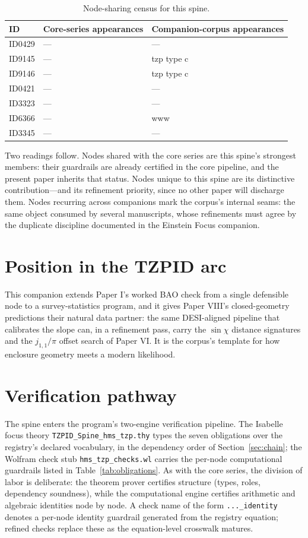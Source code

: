 \documentclass[11pt]{article}
\theoremstyle{remark}
\begin{document}
\begin{table}[ht]
\centering
\small
\caption{Node-sharing census for this spine.}
\label{tab:crosswalk}
\begin{tabular}{lp{4.4cm}p{6.6cm}}
\toprule
ID & Core-series appearances & Companion-corpus appearances \\
\midrule
ID0429 & --- & --- \\
ID9145 & --- & tzp type c \\
ID9146 & --- & tzp type c \\
ID0421 & --- & --- \\
ID3323 & --- & --- \\
ID6366 & --- & www \\
ID3345 & --- & --- \\
\bottomrule
\end{tabular}
\end{table}

Two readings follow. Nodes shared with the core series are this spine's strongest members: their guardrails are already certified in the core pipeline, and the present paper inherits that status. Nodes unique to this spine are its distinctive contribution---and its refinement priority, since no other paper will discharge them. Nodes recurring across companions mark the corpus's internal seams: the same object consumed by several manuscripts, whose refinements must agree by the duplicate discipline documented in the Einstein Focus companion.

\section{Position in the TZPID arc}
\label{sec:arc}

This companion extends Paper I's worked BAO check from a single defensible node to a survey-statistics program, and it gives Paper VIII's closed-geometry predictions their natural data partner: the same DESI-aligned pipeline that calibrates the slope can, in a refinement pass, carry the $\sin\chi$ distance signatures and the $j_{1,1}/\pi$ offset search of Paper VI. It is the corpus's template for how enclosure geometry meets a modern likelihood.

\section{Verification pathway}
\label{sec:verify}

The spine enters the program's two-engine verification pipeline. The Isabelle focus theory \texttt{TZPID\_Spine\_hms\_tzp.thy} types the seven obligations over the registry's declared vocabulary, in the dependency order of Section~\ref{sec:chain}; the Wolfram check stub \texttt{hms\_tzp\_checks.wl} carries the per-node computational guardrails listed in Table~\ref{tab:obligations}. As with the core series, the division of labor is deliberate: the theorem prover certifies structure (types, roles, dependency soundness), while the computational engine certifies arithmetic and algebraic identities node by node. A check name of the form \texttt{...\_identity} denotes a per-node identity guardrail generated from the registry equation; refined checks replace these as the equation-level crosswalk matures.
\end{document}
